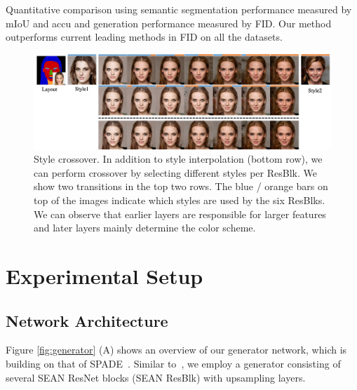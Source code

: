 \documentclass[10pt,twocolumn,letterpaper]{article}
\begin{document}
\begin{table}[thpb]

\caption{Quantitative comparison using semantic segmentation performance measured by mIoU and accu and generation performance measured by FID. Our method outperforms current leading methods in FID on all the datasets.} 
\label{tab:SSM2Image quantitative table}
\end{table}






\begin{figure}[th]
\centering
\includegraphics[width=\linewidth]{Figures/crossover.jpg}
\caption{Style crossover. In addition to style interpolation (bottom row), we can perform crossover by selecting different styles per ResBlk. We show two transitions in the top two rows. The blue / orange bars on top of the images indicate which styles are used by the six ResBlks. We can observe that earlier layers are responsible for larger features and later layers mainly determine the color scheme. 
}
\label{fig:style crossover}
\end{figure}


\section{Experimental Setup}

\subsection{Network Architecture}

Figure \ref{fig:generator} (A) shows an overview of our generator network, which is building on that of SPADE~\cite{park2019SPADE}.
Similar to~\cite{park2019SPADE}, we employ a generator consisting of several SEAN ResNet blocks (SEAN ResBlk) with upsampling layers.
\end{document}
